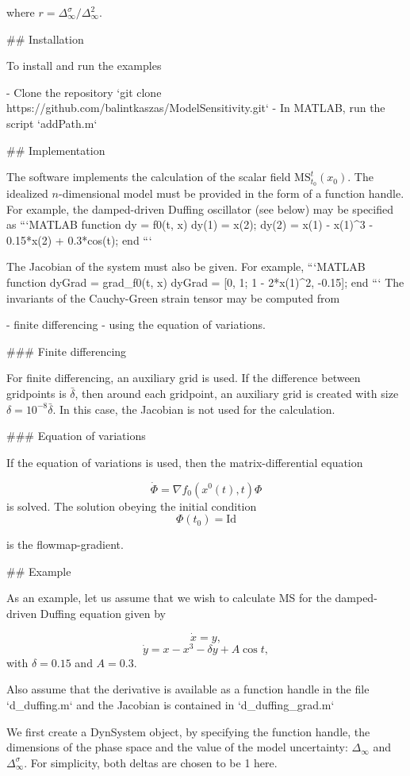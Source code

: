 where $r = \Delta_{\infty}^\sigma / \Delta_{\infty}^2$.

## Installation

To install and run the examples
 
- Clone the repository `git clone https://github.com/balintkaszas/ModelSensitivity.git`
- In MATLAB, run the script `addPath.m`

## Implementation 

The software implements the calculation of the scalar field $\text{MS}_{t_0}^t(x_0)$. 
The idealized $n$-dimensional model must be provided in the form of a function handle. For example, the damped-driven Duffing oscillator (see below) may be specified as
```MATLAB
function dy = f0(t, x)
    dy(1) = x(2);
    dy(2) = x(1) - x(1)^3 - 0.15*x(2) + 0.3*cos(t);
end
```

The Jacobian of the system must also be given. For example, 
```MATLAB
function dyGrad = grad_f0(t, x)
    dyGrad = [0, 1; 1 - 2*x(1)^2, -0.15];
end
```
The invariants of the Cauchy-Green strain tensor may be computed from 

- finite differencing 
- using the equation of variations.

### Finite differencing 

For finite differencing, an auxiliary grid is used. If the difference between gridpoints is $\bar{\delta}$, then around each gridpoint, an auxiliary grid is created with size $\delta = 10^{-8}\bar{\delta}$. 
In this case, the Jacobian is not used for the calculation.

### Equation of variations

If the equation of variations is used, then the matrix-differential equation 

$$
\dot{\Phi} = \nabla f_0\left(x^0(t),t\right) \Phi
$$
is solved. The solution obeying the initial condition
$$
\Phi(t_0) = \text{Id}
$$

is the flowmap-gradient. 


## Example

As an example, let us assume that we wish to calculate MS for the damped-driven Duffing equation given by

$$
\dot{x}=y,
$$
$$
\dot{y} = x-x^3 -\delta y + A \cos t,
$$
with $\delta = 0.15$ and $A=0.3$. 

Also assume that the derivative is available as a function handle in the file `d_duffing.m` and the Jacobian is contained in `d_duffing_grad.m`

We first create a DynSystem object, by specifying the function handle, the dimensions of the phase space and the value of the model uncertainty: $\Delta_\infty$ and $\Delta_\infty^\sigma$. For simplicity, both deltas are chosen to be 1 here.


